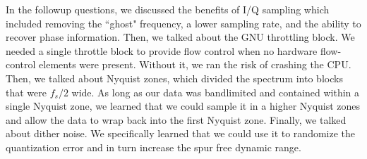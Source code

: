 \documentclass{article}
\begin{document}
In the followup questions, we discussed the benefits of I/Q sampling which included removing the ``ghost" frequency, a lower sampling rate, and the ability to recover phase information. Then, we talked about the GNU throttling block. We needed a single throttle block to provide flow control when no hardware flow-control elements were present. Without it, we ran the risk of crashing the CPU. Then, we talked about Nyquist zones, which divided the spectrum into blocks that were $f_s/2$ wide. As long as our data was bandlimited and contained within a single Nyquist zone, we learned that we could sample it in a higher Nyquist zones and allow the data to wrap back into the first Nyquist zone. Finally, we talked about dither noise. We specifically learned that we could use it to randomize the quantization error and in turn increase the spur free dynamic range.


\end{document}
